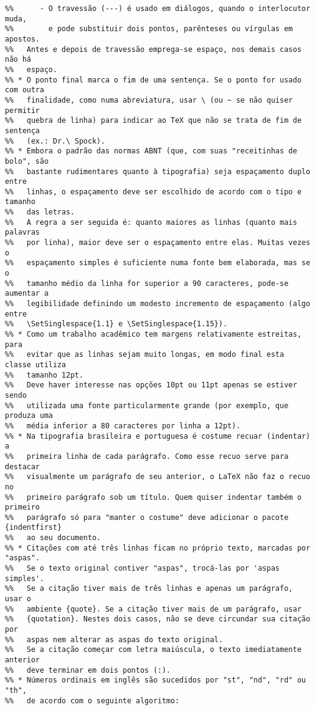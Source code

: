 \begin{verbatim}
%%      - O travessão (---) é usado em diálogos, quando o interlocutor muda,
%%        e pode substituir dois pontos, parênteses ou vírgulas em apostos.
%%   Antes e depois de travessão emprega-se espaço, nos demais casos não há 
%%   espaço.
%% * O ponto final marca o fim de uma sentença. Se o ponto for usado com outra
%%   finalidade, como numa abreviatura, usar \ (ou ~ se não quiser permitir 
%%   quebra de linha) para indicar ao TeX que não se trata de fim de sentença
%%   (ex.: Dr.\ Spock).
%% * Embora o padrão das normas ABNT (que, com suas "receitinhas de bolo", são
%%   bastante rudimentares quanto à tipografia) seja espaçamento duplo entre 
%%   linhas, o espaçamento deve ser escolhido de acordo com o tipo e tamanho
%%   das letras.
%%   A regra a ser seguida é: quanto maiores as linhas (quanto mais palavras
%%   por linha), maior deve ser o espaçamento entre elas. Muitas vezes o
%%   espaçamento simples é suficiente numa fonte bem elaborada, mas se o
%%   tamanho médio da linha for superior a 90 caracteres, pode-se aumentar a
%%   legibilidade definindo um modesto incremento de espaçamento (algo entre
%%   \SetSinglespace{1.1} e \SetSinglespace{1.15}).
%% * Como um trabalho acadêmico tem margens relativamente estreitas, para
%%   evitar que as linhas sejam muito longas, em modo final esta classe utiliza
%%   tamanho 12pt.
%%   Deve haver interesse nas opções 10pt ou 11pt apenas se estiver sendo
%%   utilizada uma fonte particularmente grande (por exemplo, que produza uma
%%   média inferior a 80 caracteres por linha a 12pt).
%% * Na tipografia brasileira e portuguesa é costume recuar (indentar) a
%%   primeira linha de cada parágrafo. Como esse recuo serve para destacar
%%   visualmente um parágrafo de seu anterior, o LaTeX não faz o recuo no
%%   primeiro parágrafo sob um título. Quem quiser indentar também o primeiro
%%   parágrafo só para "manter o costume" deve adicionar o pacote {indentfirst}
%%   ao seu documento.
%% * Citações com até três linhas ficam no próprio texto, marcadas por "aspas".
%%   Se o texto original contiver "aspas", trocá-las por 'aspas simples'.
%%   Se a citação tiver mais de três linhas e apenas um parágrafo, usar o
%%   ambiente {quote}. Se a citação tiver mais de um parágrafo, usar
%%   {quotation}. Nestes dois casos, não se deve circundar sua citação por
%%   aspas nem alterar as aspas do texto original.
%%   Se a citação começar com letra maiúscula, o texto imediatamente anterior
%%   deve terminar em dois pontos (:).
%% * Números ordinais em inglês são sucedidos por "st", "nd", "rd" ou "th",
%%   de acordo com o seguinte algoritmo:

\end{verbatim}
